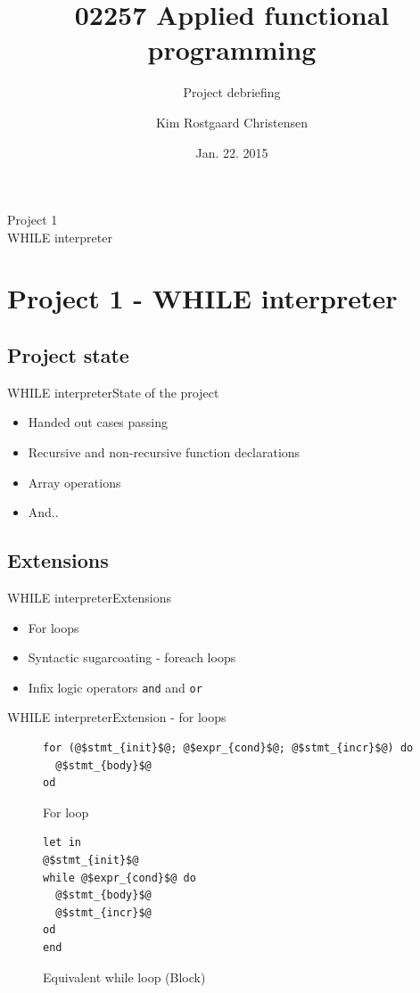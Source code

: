 \documentclass{beamer}
\title{02257 Applied functional programming}
\subtitle{Project debriefing}
\author{Kim Rostgaard Christensen}
\institute[Techical University of Denmark] %
{
  
  DTU Compute\\
  Techical University of Denmark}
\date{Jan. 22. 2015}
\begin{document}
\begin{frame}
  \titlepage
\end{frame}

\begin{frame}[plain,c]
\begin{center}
\Huge Project 1\\
\vspace{5mm}
\Large WHILE interpreter
\end{center}
\end{frame}

\section{Project 1 - WHILE interpreter}
\subsection{Project state}

\begin{frame}{WHILE interpreter}{State of the project}
  \begin{itemize}
  \item {
    Handed out cases passing
  }
  \item {
    Recursive and non-recursive function declarations
  }
  \item {
    Array operations
  }
  \pause
  \item {
    And..
  }
  \end{itemize}
\end{frame}

\subsection{Extensions}
\begin{frame}{WHILE interpreter}{Extensions}
  \begin{itemize}
  \item {
    For loops
  }
  \item {
    Syntactic sugarcoating - foreach loops
  }
  \item {
    Infix logic operators \alert{\texttt{and}} and \alert{\texttt{or}}
  }
  \end{itemize}
\end{frame}

\begin{frame}[fragile]{WHILE interpreter}{Extension - for loops}

\begin{figure}
\begin{lstlisting}
for (@$stmt_{init}$@; @$expr_{cond}$@; @$stmt_{incr}$@) do
  @$stmt_{body}$@
od
\end{lstlisting}
\caption{For loop}
\end{figure}

\begin{figure}
\begin{lstlisting}
let in
@$stmt_{init}$@
while @$expr_{cond}$@ do 
  @$stmt_{body}$@
  @$stmt_{incr}$@
od
end
\end{lstlisting}
\caption{Equivalent while loop (Block)}
\end{figure}
\end{frame}
\end{document}
